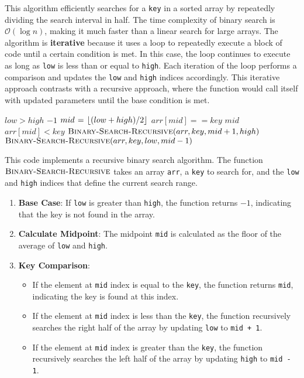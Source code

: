 This algorithm efficiently searches for a \texttt{key} in a sorted array by repeatedly dividing the search interval in half. The time complexity of binary search is \(\mathcal{O}(\log n)\), making it much faster than a linear search for large arrays. The algorithm is \textbf{iterative} because it uses a \texttt{\While} loop to repeatedly execute a block of code until a certain condition is met. In this case, the loop continues to execute as long as \texttt{low} is less than or equal to \texttt{high}. Each iteration of the loop performs a comparison and updates the \texttt{low} and \texttt{high} indices accordingly. This iterative approach contrasts with a recursive approach, where the function would call itself with updated parameters until the base condition is met.

\begin{codebox}
    \li \If $low > high$ \Then
    \li     \Return $-1$  \End
    \li $mid \mathrel{\hspace{1pt}=\hspace{1pt}} \left\lfloor (low + high) / 2 \right\rfloor$ 
    \li \If $arr[mid] == key$ \Then
    \li     \Return $mid$ 
    \li \ElseIf $arr[mid] < key$ \Then
    \li     {}
    \li     \Return $\proc{Binary-Search-Recursive}(arr, key, mid + 1, high)$
    \li \Else
    \li     {}
    \li     \Return $\proc{Binary-Search-Recursive}(arr, key, low, mid - 1)$ 
        \End
\end{codebox}

This code implements a recursive binary search algorithm. The function $\proc{Binary-Search-Recursive}$ takes an array \texttt{arr}, a \texttt{key} to search for, and the \texttt{low} and \texttt{high} indices that define the current search range.

\begin{enumerate}
    \item \textbf{Base Case}: If \texttt{low} is greater than \texttt{high}, the function returns $-1$, indicating that the key is not found in the array.
    \item \textbf{Calculate Midpoint}: The midpoint \texttt{mid} is calculated as the floor of the average of \texttt{low} and \texttt{high}.
    \item \textbf{Key Comparison}:
    \begin{itemize}
        \item If the element at \texttt{mid} index is equal to the \texttt{key}, the function returns \texttt{mid}, indicating the key is found at this index.
        \item If the element at \texttt{mid} index is less than the \texttt{key}, the function recursively searches the right half of the array by updating \texttt{low} to \texttt{mid + 1}.
        \item If the element at \texttt{mid} index is greater than the \texttt{key}, the function recursively searches the left half of the array by updating \texttt{high} to \texttt{mid - 1}.
    \end{itemize}
\end{enumerate}

